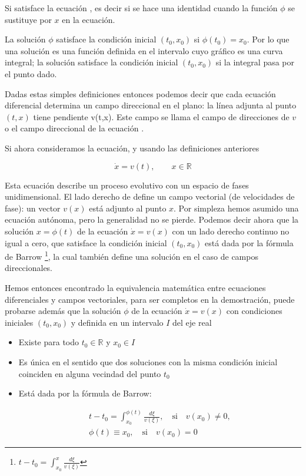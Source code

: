 \documentclass[a4paper,10pt]{article}
\numberwithin{equation}{section}
\begin{document}
Si satisface la ecuación , es decir si se hace una identidad cuando
la función $\phi$ se sustituye por $x$ en la ecuación.

La solución $\phi$ satisface la condición inicial $(t_0, x_0)$ si $\phi(t_0)= x_0$. Por
lo que una solución es una función definida en el intervalo cuyo gráfico es una curva integral;
la solución satisface la condición inicial $(t_0, x_0)$  si la integral pasa por el
punto dado.

Dadas estas simples definiciones entonces podemos decir que cada ecuación diferencial 
 determina un campo direccional en el plano: la línea adjunta al punto
$(t,x)$ tiene pendiente v(t,x). Este campo se llama el campo de direcciones de $v$ o 
el campo direccional de la ecuación . 

Si ahora consideramos la ecuación, y usando las definiciones anteriores

\begin{equation}
 \dot{x} = v(t), \qquad x \in \mathbb{R}
 \label{eq:pro5e3}
\end{equation}

Esta ecuación describe un proceso evolutivo con un espacio de fases 
unidimensional. El lado derecho de  define un campo
vectorial (de velocidades de fase): un vector $v(x)$ está adjunto al punto
$x$. Por simpleza hemos asumido una ecuación autónoma, pero la generalidad
no se pierde. Podemos decir ahora que la solución $x=\phi(t)$ de la ecuación
$\dot{x} = v(x)$ con un lado derecho continuo no igual a cero, que satisface 
la condición inicial $(t_0,x_0)$ está dada por la fórmula de Barrow
\footnote{$t-t_0 = \int_{x_0}^x \frac{d\xi}{v(\xi)}$}, la cual también define 
una solución en el caso de campos direccionales.

\vspace{.3cm}

Hemos entonces encontrado la equivalencia matemática entre ecuaciones diferenciales
y campos vectoriales, para ser completos en la demostración, puede probarse además
que la solución $\phi$ de la ecuación $\dot{x} = v(x)$ con condiciones iniciales
$(t_0,x_0)$ y definida en un intervalo $I$ del eje real

\begin{itemize}
 \item Existe para todo $t_0 \in \mathbb{R}$ y $x_0 \in I$
 \item Es única en el sentido que dos soluciones con la misma condición
 inicial coinciden en alguna vecindad del punto $t_0$
 \item Está dada por la fórmula de Barrow:
 
 \begin{gather*}
  t - t_0= \int_{x_0}^{\phi(t)} \frac{d\xi}{v(\xi)}, \quad \text{si} \quad v(x_0) \neq 0, \\
  \phi(t) \equiv x_0, \quad \text{si} \quad v(x_0) = 0
 \end{gather*}
\end{itemize}
\end{document}
